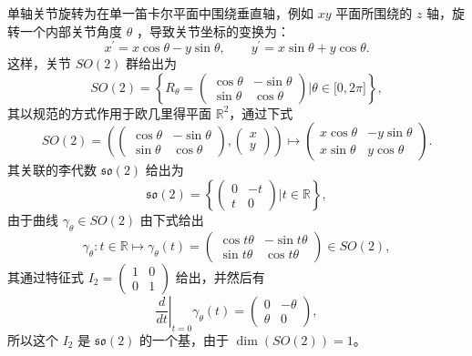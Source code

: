 \documentclass[11pt,fontset=founder]{ctexart}
\begin{document}
单轴关节旋转为在单一笛卡尔平面中围绕垂直轴，例如 $xy$ 平面所围绕的 $z$ 轴，旋转一个内部关节角度 $\theta$ ，导致关节坐标的变换为：
\begin{equation*}
x^{\prime }=x\cos \theta -y\sin \theta ,\qquad y^{\prime }=x\sin \theta
+y\cos \theta .
\end{equation*}
这样，关节 $SO(2)$ 群给出为
\begin{equation*}
SO(2)=\left\{ R_{\theta }=\left(
\begin{array}{cc}
\cos \theta & -\sin \theta \\
\sin \theta & \cos \theta%
\end{array}%
\right) |\theta \in \lbrack 0,2\pi ]\right\},
\end{equation*}%
其以规范的方式作用于欧几里得平面 $\mathbb{R}^{2}$，通过下式
\begin{equation*}
SO(2)=\left( \left(
\begin{array}{cc}
\cos \theta & -\sin \theta \\
\sin \theta & \cos \theta%
\end{array}%
\right) ,\left(
\begin{array}{c}
x \\
y%
\end{array}%
\right) \right) \longmapsto \left(
\begin{array}{cc}
x\cos \theta & -y\sin \theta \\
x\sin \theta & y\cos \theta%
\end{array}%
\right).
\end{equation*}
其关联的李代数 $\mathfrak{so}(2)$ 给出为
\begin{equation*}
\mathfrak{so}(2)=\left\{ \left(
\begin{array}{cc}
0 & -t \\
t & 0%
\end{array}%
\right) |t\in \mathbb{R}\right\} ,
\end{equation*}%
由于曲线 $\gamma _{\theta }\in SO(2)$ 由下式给出
\begin{equation*}
\gamma _{\theta }:t\in \mathbb{R}\longmapsto \gamma _{\theta }(t)=\left(
\begin{array}{cc}
\cos t\theta & -\sin t\theta \\
\sin t\theta & \cos t\theta%
\end{array}%
\right) \in SO(2),
\end{equation*}%
其通过特征式 $I_{2}=\left(
\begin{array}{cc}
1 & 0 \\
0 & 1%
\end{array}%
\right) $ 给出，并然后有
\begin{equation*}
\left. \frac{d}{dt}\right\vert _{t=0}\gamma _{\theta }(t)=\left(
\begin{array}{cc}
0 & -\theta \\
\theta & 0%
\end{array}%
\right) ,
\end{equation*}%
所以这个 $I_{2}$ 是 $\mathfrak{so}(2)$ 的一个基，由于 $\dim \left(
SO(2)\right) =1$。
\end{document}

